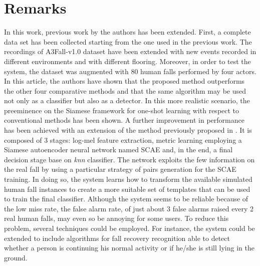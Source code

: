 \section{Remarks}
In this work, previous work by the authors \cite{droghini2018fewshot} has been extended. First, a complete data set has been collected starting from the one used in the previous work. The recordings of A3Fall-v1.0 dataset have been extended with new events recorded in different environments and with different flooring. Moreover, in order to test the system, the dataset was augmented with 80 human falls performed by four actors. In this article, the authors have shown that the proposed method outperforms the other four comparative methods and that the same algorithm may be used not only as a classifier but also as a detector. In this more realistic scenario, the preeminence on the Siamese framework for one-shot learning with respect to conventional methods has been shown. A further improvement in performance has been achieved with an extension of the method previously proposed in \cite{droghini2018fewshot}. It is composed of 3 stages: log-mel feature extraction, metric learning employing a Siamese autoencoder neural network named SCAE and, in the end, a final decision stage base on \textit{knn} classifier. The network exploits the few information on the real fall by using a particular strategy of pairs generation for the SCAE training. In doing so, the system learns how to transform the available simulated human fall instances to create a more suitable set of templates that can be used to train the final classifier. 
Although the system seems to be reliable because of the low miss rate, the false alarm rate, of just about 3 false alarms raised every 2 real human falls, may even so be annoying for some users. To reduce this problem, several techniques could be employed. For instance, the system could be extended to include algorithms for fall recovery recognition able to detect whether a person is continuing his normal activity or if he/she is still lying in the ground.
